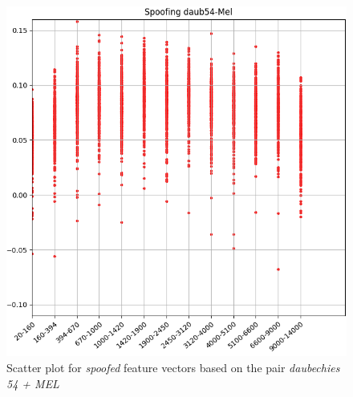 \begin{figure}[H]
\centering
\includegraphics[scale=.55]{images/results/barkVersusMel/spoofingDaub54Mel}
\caption{Scatter plot for \textit{spoofed} feature vectors  based on the pair \textit{daubechies 54 + MEL}}
\label{fig:spoofingdaub54mel}
\end{figure}
